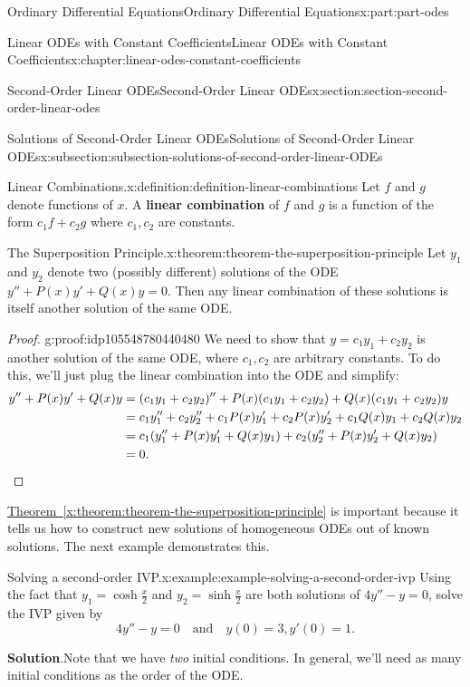 \documentclass[oneside,10pt,]{book}
\newcommand{\blocktitlefont}{\relax}
\newcommand{\xreffont}{\relax}
\newcommand{\terminology}[1]{\textbf{#1}}
\numberwithin{equation}{part}
\newcommand{\qedhere}{\relax}
\newcommand{\amp}{&}
\begin{document}
\begin{partptx}{Ordinary Differential Equations}{}{Ordinary Differential Equations}{}{}{x:part:part-odes}
\begin{chapterptx}{Linear ODEs with Constant Coefficients}{}{Linear ODEs with Constant Coefficients}{}{}{x:chapter:linear-odes-constant-coefficients}
\begin{sectionptx}{Second-Order Linear ODEs}{}{Second-Order Linear ODEs}{}{}{x:section:section-second-order-linear-odes}
\begin{subsectionptx}{Solutions of Second-Order Linear ODEs}{}{Solutions of Second-Order Linear ODEs}{}{}{x:subsection:subsection-solutions-of-second-order-linear-ODEs}
\begin{definition}{Linear Combinations.}{x:definition:definition-linear-combinations}
Let \(f\) and \(g\) denote functions of \(x\). A \terminology{linear combination} of \(f\) and \(g\) is a function of the form \(c_{1}f+c_{2}g\) where \(c_{1},c_{2}\) are constants.%
\end{definition}
\begin{theorem}{The Superposition Principle.}{}{x:theorem:theorem-the-superposition-principle}%
%
Let \(y_{1}\) and \(y_{2}\) denote two (possibly different) solutions of the ODE \(y''+P(x)y'+Q(x)y = 0\). Then any linear combination of these solutions is itself another solution of the same ODE.%
\end{theorem}
\begin{proof}{}{g:proof:idp105548780440480}
We need to show that \(y = c_{1}y_{1} + c_{2}y_{2}\) is another solution of the same ODE, where \(c_{1},c_{2}\) are arbitrary constants. To do this, we'll just plug the linear combination into the ODE and simplify:%
\begin{align*}
y''+P(x)y'+Q(x)y \amp = (c_{1}y_{1}+c_{2}y_{2})''+P(x)(c_{1}y_{1}+c_{2}y_{2})+Q(x)(c_{1}y_{1}+c_{2}y_{2})y \\
\amp = c_{1}y''_{1}+c_{2}y''_{2} + c_{1}P(x)y'_{1}+c_{2}P(x)y'_{2} + c_{1}Q(x)y_{1} + c_{2}Q(x)y_{2}\\
\amp = c_{1}(y''_{1}+P(x)y'_{1}+Q(x)y_{1}) + c_{2}(y''_{2}+P(x)y'_{2}+Q(x)y_{2}) \\
\amp = 0. \qedhere
\end{align*}
%
\end{proof}
\hyperref[x:theorem:theorem-the-superposition-principle]{Theorem~{\xreffont\ref{x:theorem:theorem-the-superposition-principle}}} is important because it tells us how to construct new solutions of homogeneous ODEs out of known solutions. The next example demonstrates this.%
\begin{example}{Solving a second-order IVP.}{x:example:example-solving-a-second-order-ivp}%
Using the fact that \(y_{1} = \cosh\frac{x}{2}\) and \(y_{2} = \sinh\frac{x}{2}\) are both solutions of \(4y''-y = 0\), solve the IVP given by%
\begin{equation*}
4y''-y=0\quad\text{and}\quad y(0)=3,y'(0)=1.
\end{equation*}
%
\par\smallskip%
\noindent\textbf{\blocktitlefont Solution}.\hypertarget{g:solution:idp105548780216608}{}\quad{}Note that we have \emph{two} initial conditions. In general, we'll need as many initial conditions as the order of the ODE.%
\par

\end{example}
\end{subsectionptx}
\end{sectionptx}
\end{chapterptx}
\end{partptx}
\end{document}
